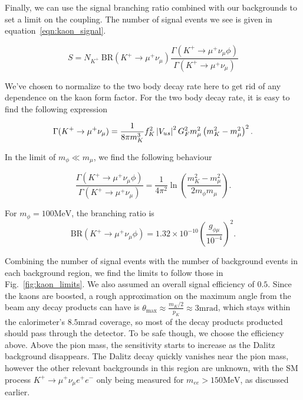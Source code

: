 Finally, we can use the signal branching ratio combined with our backgrounds to set a limit on the coupling.
The number of signal events we see is given in equation~\ref{eqn:kaon_signal}.

\begin{equation}
    S = N_{K^+}~\textrm{BR}(K^+ \rightarrow \mu^+ \nu_\mu) \frac{\Gamma(K^+ \rightarrow \mu^+ \nu_\mu \phi)}{\Gamma(K^+ \rightarrow \mu^+ \nu_\mu)}
    \label{eqn:kaon_signal}
\end{equation}

\noindent We've chosen to normalize to the two body decay rate here to get rid of any dependence on the kaon form factor.
For the two body decay rate, it is easy to find the following expression

\begin{equation}
    \Gamma(K^+ \rightarrow \mu^+ \nu_\mu) = \frac{1}{8\pi m_K^3}\mathnormal{f}_K^2 \left|V_{us}\right|^2 G_F^2 m_\mu^2 \left(m_K^2 - m_\mu^2\right)^2\textrm{.}
\end{equation}

\noindent In the limit of $m_\phi \ll m_\mu$, we find the following behaviour

\begin{equation}
    \frac{\Gamma(K^+ \rightarrow \mu^+ \nu_\mu \phi)}{\Gamma(K^+ \rightarrow \mu^+ \nu_\mu)} = \frac{1}{4\pi^2} \ln\left(\frac{m_K^2 - m_\mu^2}{2 m_\phi m_\mu} \right)\textrm{.}
\end{equation}

\noindent For $m_\phi = 100\textrm{MeV}$, the branching ratio is
\begin{equation}
    \textrm{BR}(K^+ \rightarrow \mu^+ \nu_\mu \phi) = 1.32\times 10^{-10} \left(\frac{g_{\phi\mu}}{10^{-4}}\right)^2\textrm{.}
\end{equation}

Combining the number of signal events with the number of background events in each background region, we find the limits to follow those in Fig.~\ref{fig:kaon_limits}.
We also assumed an overall signal efficiency of $0.5$.
Since the kaons are boosted, a rough approximation on the maximum angle from the beam any decay products can have is $\theta_\textrm{max} \approx \frac{m_K/2}{p_K} \approx 3\textrm{mrad}$, which stays within the calorimeter's $8.5\textrm{mrad}$ coverage, so most of the decay products producted should pass through the detector.
To be safe though, we choose the efficiency above.
Above the pion mass, the sensitivity starts to increase as the Dalitz background disappears.
The Dalitz decay quickly vanishes near the pion mass, however the other relevant backgrounds in this region are unknown, with the SM process $K^+ \rightarrow \mu^+ \nu_\mu e^+ e^-$ only being measured for $m_{ee} > 150\textrm{MeV}$, as discussed earlier.

